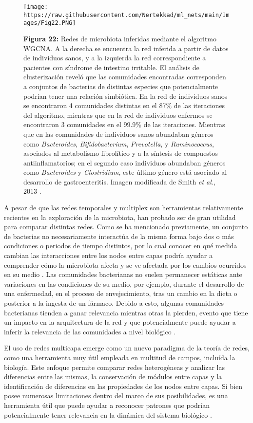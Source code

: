 \documentclass[
]{book}
\begin{document}
\begin{figure}
\centering
\texttt{[image: https://raw.githubusercontent.com/Nertekkad/ml\_nets/main/Images/Fig22.PNG]}
\caption{\textbf{Figura 22:} Redes de microbiota inferidas mediante el algoritmo WGCNA. A la derecha se encuentra la red inferida a partir de datos de individuos sanos, y a la izquierda la red correspondiente a pacientes con síndrome de intestino irritable. El análisis de clusterización reveló que las comunidades encontradas corresponden a conjuntos de bacterias de distintas especies que potencialmente podrían tener una relación simbiótica. En la red de individuos sanos se encontraron 4 comunidades distintas en el 87\% de las iteraciones del algoritmo, mientras que en la red de individuos enfermos se encontraron 3 comunidades en el 99.9\% de las iteraciones. Mientras que en las comunidades de individuos sanos abundaban géneros como \emph{Bacteroides}, \emph{Bifidobacterium}, \emph{Prevotella}, y \emph{Ruminococcus}, asociados al metabolismo fibrolítico y a la síntesis de compuestos antiinflamatorios; en el segundo caso individuos abundaban géneros como \emph{Bacteroides} y \emph{Clostridium}, este último género está asociado al desarrollo de gastroenteritis. Imagen modificada de Smith \emph{et al.}, 2013 \citep{baldassano2016topological}.}
\end{figure}

A pesar de que las redes temporales y multiplex son herramientas relativamente recientes en la exploración de la microbiota, han probado ser de gran utilidad para comparar distintas redes. Como se ha mencionado previamente, un conjunto de bacterias no necesariamente interactúa de la misma forma bajo dos o más condiciones o periodos de tiempo distintos, por lo cual conocer en qué medida cambian las interacciones entre los nodos entre capas podría ayudar a comprender cómo la microbiota afecta y se ve afectada por los cambios ocurridos en su medio \citep{colizza2006detecting}. Las comunidades bacterianas no suelen permanecer estáticas ante variaciones en las condiciones de su medio, por ejemplo, durante el desarrollo de una enfermedad, en el proceso de envejecimiento, tras un cambio en la dieta o posterior a la ingesta de un fármaco. Debido a esto, algunas comunidades bacterianas tienden a ganar relevancia mientras otras la pierden, evento que tiene un impacto en la arquitectura de la red y que potencialmente puede ayudar a inferir la relevancia de las comunidades a nivel biológico \citep{guimera2005cartography}.

El uso de redes multicapa emerge como un nuevo paradigma de la teoría de redes, como una herramienta muy útil empleada en multitud de campos, incluída la biología. Este enfoque permite comparar redes heterogéneas y analizar las diferencias entre las mismas, la conservación de módulos entre capas y la identificación de diferencias en las propiedades de los nodos entre capas. Si bien posee numerosas limitaciones dentro del marco de sus posibilidades, es una herramienta útil que puede ayudar a reconocer patrones que podrían potencialmente tener relevancia en la dinámica del sistema biológico \citep{zheng2018improving}.
\end{document}
